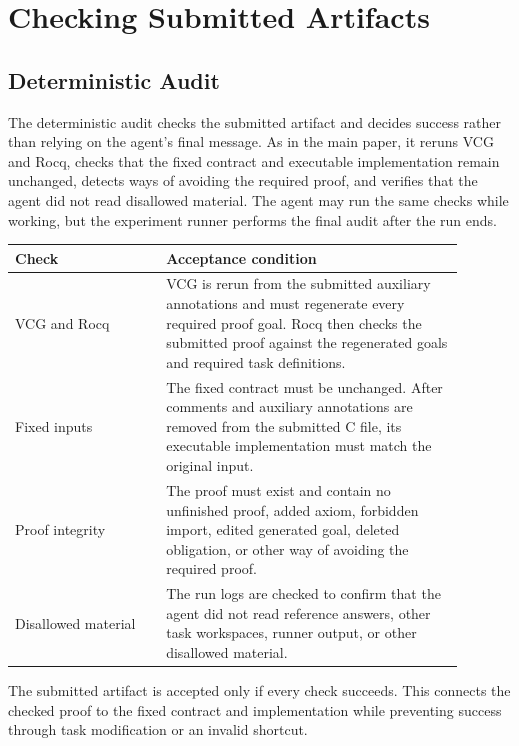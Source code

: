 \section{Checking Submitted Artifacts}
\label{app:acceptance-protocol}

\subsection{Deterministic Audit}
\label{app:audit-checklist}

The deterministic audit checks the submitted artifact and decides success rather than relying on the agent's final message. As in the main paper, it reruns VCG and Rocq, checks that the fixed contract and executable implementation remain unchanged, detects ways of avoiding the required proof, and verifies that the agent did not read disallowed material. The agent may run the same checks while working, but the experiment runner performs the final audit after the run ends.

\begin{center}
\small
\begin{tabular}{L{0.30\linewidth}L{0.59\linewidth}}
\toprule
\textbf{Check} & \textbf{Acceptance condition} \\
\midrule
VCG and Rocq & VCG is rerun from the submitted auxiliary annotations and must regenerate every required proof goal. Rocq then checks the submitted proof against the regenerated goals and required task definitions. \\
Fixed inputs & The fixed contract must be unchanged. After comments and auxiliary annotations are removed from the submitted C file, its executable implementation must match the original input. \\
Proof integrity & The proof must exist and contain no unfinished proof, added axiom, forbidden import, edited generated goal, deleted obligation, or other way of avoiding the required proof. \\
Disallowed material & The run logs are checked to confirm that the agent did not read reference answers, other task workspaces, runner output, or other disallowed material. \\
\bottomrule
\end{tabular}
\end{center}

The submitted artifact is accepted only if every check succeeds. This connects the checked proof to the fixed contract and implementation while preventing success through task modification or an invalid shortcut.

